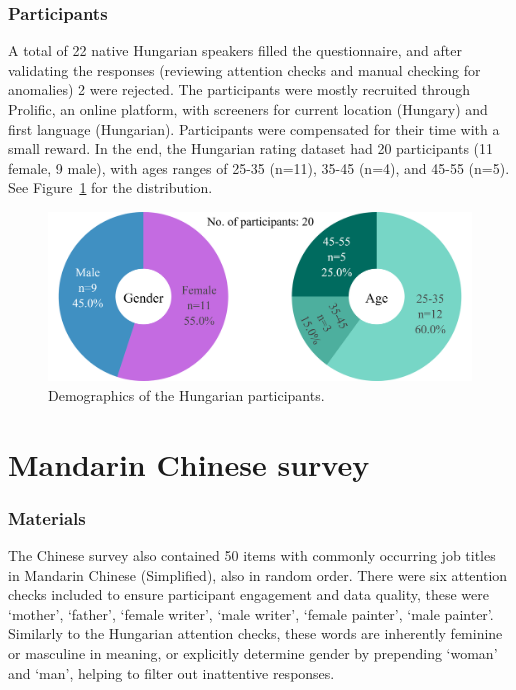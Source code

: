 \documentclass[11pt]{article}
\newcommand{\zh}[1]{\simplifiedchinesefont{#1}\rmfamily}
\begin{document}
\subsubsection{Participants}

A total of 22 native Hungarian speakers filled the questionnaire, and after validating the responses (reviewing attention checks and manual checking for anomalies) 2 were rejected. The participants were mostly recruited through Prolific, an online platform, with screeners for current location (Hungary) and first language (Hungarian). Participants were compensated for their time with a small reward. In the end, the Hungarian rating dataset had 20 participants (11 female, 9 male), with ages ranges of 25-35 (n=11), 35-45 (n=4), and 45-55 (n=5). See Figure~\ref{fig:demographics_hu} for the distribution.

\begin{figure}[ht]
  \centering
  \includegraphics[width=\linewidth]{../demographics_hu}
  \caption{Demographics of the Hungarian participants.}
  \label{fig:demographics_hu}
\end{figure}

\section{Mandarin Chinese survey}

\subsubsection{Materials}

The Chinese survey also contained 50 items with commonly occurring job titles in Mandarin Chinese (Simplified), also in random order. There were six attention checks included to ensure participant engagement and data quality, these were \zh{妈妈} `mother', \zh{爸爸} `father', \zh{女作家} `female writer', \zh{男作家} `male writer', \zh{女画家} `female painter', \zh{男画家} `male painter'. Similarly to the Hungarian attention checks, these words are inherently feminine or masculine in meaning, or explicitly determine gender by prepending \zh{女} `woman' and \zh{男} `man', helping to filter out inattentive responses.
\end{document}
